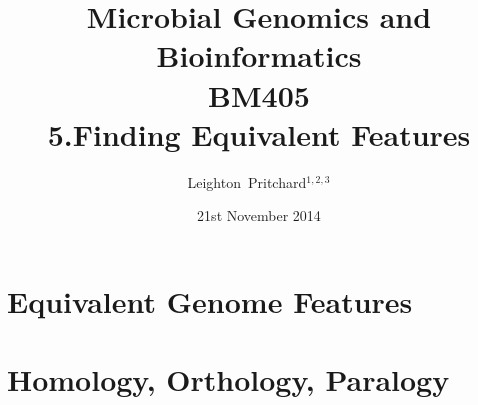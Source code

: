 

%



\title[Microbial Genomics and Bioinformatics: 5.Equivalent Features] %
{Microbial Genomics and \\ Bioinformatics \\
BM405 \\
5.Finding Equivalent Features}
\author[Pritchard] %
{Leighton~Pritchard$^{1,2,3}$}
\date[21st November 2014] %
{21st November 2014}
\subject{Bioinformatics, Genomics, Bacteria, Sequencing, Microbiology, Microbes}





\frame[plain]{\titlepage}



\section{Equivalent Genome Features}


\section{Homology, Orthology, Paralogy}

%
%

